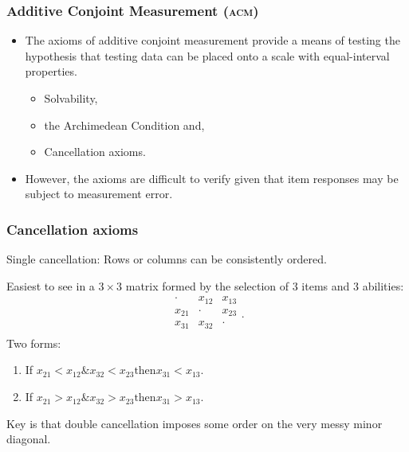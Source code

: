 \documentclass[10pt,serif,professionalfont]{beamer}
\begin{document}
\begin{frame}
    \frametitle{Additive Conjoint Measurement (\textsc{acm})}


    \begin{itemize}
        \item The axioms of additive conjoint measurement provide a means of testing the hypothesis that testing data can be placed onto a scale with equal-interval properties.
        \begin{itemize}
            \item Solvability, 
            \item the Archimedean Condition and,
            \item Cancellation axioms.
        \end{itemize}
        \item However, the axioms are difficult to verify given that item responses may be subject to measurement error.
    \end{itemize}

\end{frame}

\begin{frame} %
    \frametitle{Cancellation axioms}
    Single cancellation: Rows or columns can be consistently ordered.%

    Easiest to see in a $3 \times 3$ matrix formed by the selection of 3 items and 3 abilities:
    \[
    \begin{array}{ccc}
      \cdot&x_{12} &x_{13}  \\
      x_{21}&\cdot&x_{23} \\
      x_{31} & x_{32}&\cdot\\
    \end{array}.
    \]
    Two forms: 
    \begin{enumerate}
    \item If $x_{21}<x_{12} \& x_{32}<x_{23} \text{then} x_{31}<x_{13}$. 
    \item If $x_{21}>x_{12} \& x_{32}>x_{23} \text{then} x_{31}>x_{13}$. 
    \end{enumerate}
    Key is that double cancellation imposes some order on the very messy minor diagonal.

\end{frame}
\end{document}
